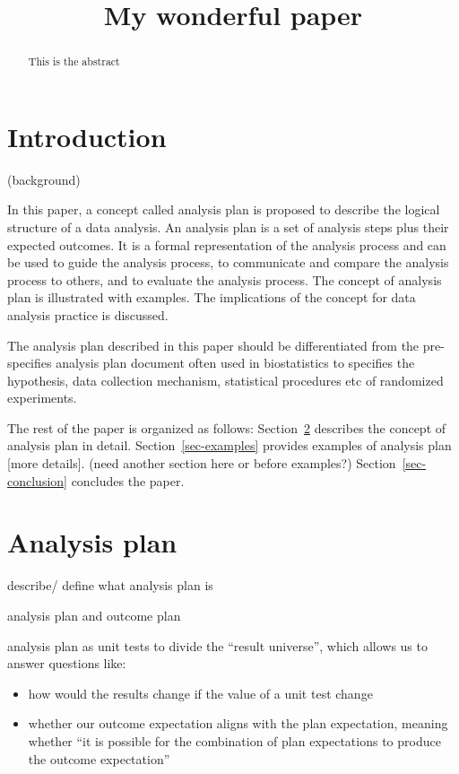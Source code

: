 \documentclass[
]{jds}
\title{My wonderful paper}
\author{}
\date{}
\providecommand{\tightlist}{%
  \setlength{\itemsep}{0pt}\setlength{\parskip}{0pt}}\usepackage{longtable,booktabs,array}
\begin{document}
\maketitle
\begin{abstract}
This is the abstract
\end{abstract}

\section{Introduction}\label{introduction}

(background)

In this paper, a concept called analysis plan is proposed to describe
the logical structure of a data analysis. An analysis plan is a set of
analysis steps plus their expected outcomes. It is a formal
representation of the analysis process and can be used to guide the
analysis process, to communicate and compare the analysis process to
others, and to evaluate the analysis process. The concept of analysis
plan is illustrated with examples. The implications of the concept for
data analysis practice is discussed.

The analysis plan described in this paper should be differentiated from
the pre-specifies analysis plan document often used in biostatistics to
specifies the hypothesis, data collection mechanism, statistical
procedures etc of randomized experiments.

The rest of the paper is organized as follows: Section~\ref{sec-plan}
describes the concept of analysis plan in detail.
Section~\ref{sec-examples} provides examples of analysis plan {[}more
details{]}. (need another section here or before examples?)
Section~\ref{sec-conclusion} concludes the paper.

\section{Analysis plan}\label{sec-plan}

describe/ define what analysis plan is

analysis plan and outcome plan

analysis plan as unit tests to divide the ``result universe'', which
allows us to answer questions like:

\begin{itemize}
\tightlist
\item
  how would the results change if the value of a unit test change
\item
  whether our outcome expectation aligns with the plan expectation,
  meaning whether ``it is possible for the combination of plan
  expectations to produce the outcome expectation''
\end{itemize}
\end{document}
